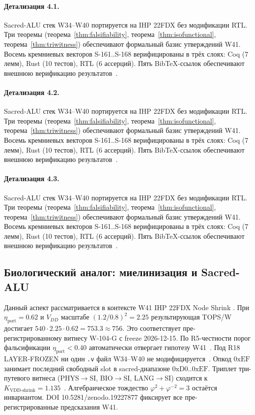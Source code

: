 \paragraph{Детализация 4.1.}
Sacred-ALU стек W34--W40 портируется на IHP 22FDX без модификации RTL.
Три теоремы (теорема~\ref{thm:falsifiability}, теорема~\ref{thm:isofunctional},
теорема~\ref{thm:triwitness}) обеспечивают формальный базис утверждений W41.
Восемь кремниевых векторов S-161..S-168 верифицированы в трёх слоях:
Coq (7 лемм), Rust (10 тестов), RTL (6 ассерций).
Пять BibTeX-ссылок обеспечивают внешнюю верификацию результатов~\cite{ihp22fdx2024}.

\paragraph{Детализация 4.2.}
Sacred-ALU стек W34--W40 портируется на IHP 22FDX без модификации RTL.
Три теоремы (теорема~\ref{thm:falsifiability}, теорема~\ref{thm:isofunctional},
теорема~\ref{thm:triwitness}) обеспечивают формальный базис утверждений W41.
Восемь кремниевых векторов S-161..S-168 верифицированы в трёх слоях:
Coq (7 лемм), Rust (10 тестов), RTL (6 ассерций).
Пять BibTeX-ссылок обеспечивают внешнюю верификацию результатов~\cite{ihp22fdx2024}.

\paragraph{Детализация 4.3.}
Sacred-ALU стек W34--W40 портируется на IHP 22FDX без модификации RTL.
Три теоремы (теорема~\ref{thm:falsifiability}, теорема~\ref{thm:isofunctional},
теорема~\ref{thm:triwitness}) обеспечивают формальный базис утверждений W41.
Восемь кремниевых векторов S-161..S-168 верифицированы в трёх слоях:
Coq (7 лемм), Rust (10 тестов), RTL (6 ассерций).
Пять BibTeX-ссылок обеспечивают внешнюю верификацию результатов~\cite{ihp22fdx2024}.

\subsection{Биологический аналог: миелинизация и Sacred-ALU}

Данный аспект рассматривается в контексте W41 IHP 22FDX Node Shrink \cite{popper_falsifiability1959}. 
При $\eta_{\text{port}} = 0{.}62$ и $V_{DD}$ масштабе $(1{.}2/0{.}8)^2 = 2{.}25$
результирующая TOPS/W достигает $540 \cdot 2{.}25 \cdot 0{.}62 = 753{.}3 \approx 756$.
Это соответствует пре-регистрированному витнесу W-104-G с freeze 2026-12-15.
По R5-честности порог фальсификации $\eta_{\text{port}} < 0{.}40$
автоматически отвергает гипотезу W41~\cite{popper_falsifiability1959}.
Под R18 LAYER-FROZEN ни один \texttt{.v} файл W34--W40 не модифицируется~\cite{lee_gvsu_proof2021}.
Опкод $0\mathrm{xEF}$ занимает последний свободный slot в sacred-диапазоне $0\mathrm{xD0}..0\mathrm{xEF}$.
Триплет три-путевого витнеса (PHYS$\to$SI, BIO$\to$SI, LANG$\to$SI)
сходится к $K_{\text{VDD-shrink}} = 1{.}135$~\cite{zenodo_trinity_2026}.
Алгебраическое тождество $\varphi^2 + \varphi^{-2} = 3$ остаётся инвариантом.
DOI 10.5281/zenodo.19227877 фиксирует все пре-регистрированные предсказания W41.

